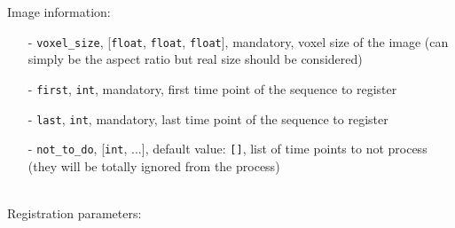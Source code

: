 \documentclass[10pt,a4paper]{article}
\begin{document}
Image information:
\begin{itemize}
\item[-] \texttt{voxel\_size}, [\texttt{float}, \texttt{float}, \texttt{float}], mandatory, voxel size of the image (can simply be the aspect ratio but real size should be considered)
\item[-] \texttt{first}, \texttt{int}, mandatory, first time point of the sequence to register
\item[-] \texttt{last}, \texttt{int}, mandatory, last time point of the sequence to register
\item[-] \texttt{not\_to\_do}, [\texttt{int}, ...], default value: \texttt{[]}, list of time points to not process (they will be totally ignored from the process)
\end{itemize}~\\
Registration parameters:
\end{document}
